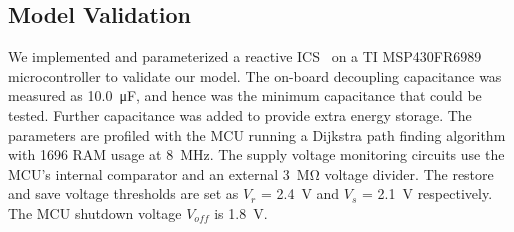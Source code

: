 
\subsection{Model Validation} \label{section:experiment}

We implemented and parameterized a reactive ICS~\cite{6960060} on a TI MSP430FR6989 microcontroller to validate our model. The on-board decoupling capacitance was measured as \SI{10.0}{\micro\farad}, and hence was the minimum capacitance that could be tested. Further capacitance was added to provide extra energy storage. The parameters are profiled with the MCU running a Dijkstra path finding algorithm with \SI{1696}{\byte} RAM usage at \SI{8}{\mega\hertz}. The supply voltage monitoring circuits use the MCU's internal comparator and an external \SI{3}{\mega\ohm} voltage divider. The restore and save voltage thresholds are set as $V_{r}$ = \SI{2.4}{\volt} and $V_{s}$ = \SI{2.1}{\volt} respectively. The MCU shutdown voltage $V_{off}$ is \SI{1.8}{\volt}. 



